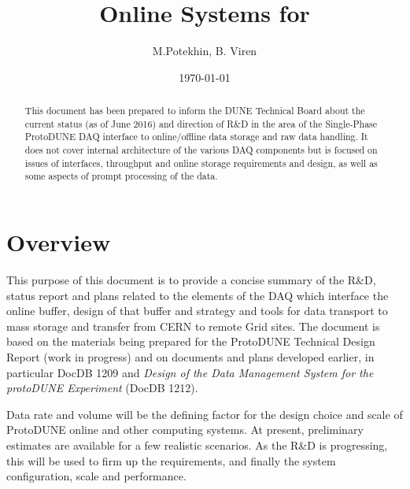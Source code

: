 \documentclass[pdftex,12pt,letter]{article}
\title{Online Systems for \pd}
\date{\today}
\author{M.Potekhin, B. Viren}
\newcommand{\pd}{ProtoDUNE\xspace}
\begin{document}

\maketitle

\begin{abstract}
\noindent This document has been prepared to inform the DUNE Technical Board about the current status
(as of June 2016) and direction of R\&D in the area of the Single-Phase \pd DAQ interface to online/offline data storage
and raw data handling. It does not cover internal architecture of the various DAQ components but is focused on
issues of interfaces, throughput and online storage requirements and design, as well as some aspects of prompt
processing of the data.
\end{abstract}

\tableofcontents

\pagebreak

\section{Overview}

This purpose of this document is to provide a concise summary of
the R\&D, status report and plans related to the elements of the DAQ which interface
the online buffer, design of that buffer and strategy and tools
for data transport to mass storage and transfer from CERN to remote Grid sites.
The document is based on the materials being prepared for the \pd Technical Design Report  (work in progress)
and on documents and plans developed earlier, in particular DocDB 1209 and \textit{Design of
the Data Management System for the protoDUNE Experiment} (DocDB 1212).

Data rate and volume will be the defining factor for the design choice and scale of \pd online and other computing systems.
At present, preliminary estimates are available for a few realistic scenarios. As the R\&D is progressing, this will
be used to firm up the requirements, and finally the system configuration, scale and performance.
\end{document}
